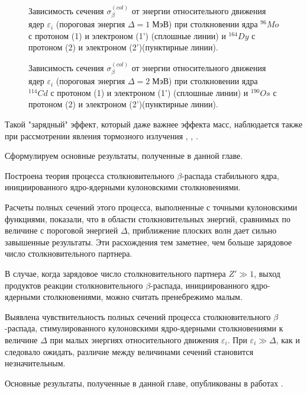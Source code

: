 \begin{figure}
\vspace{18 true cm}
\caption{{ Зависимость сечения  $\sigma^{(col)}_\beta$ от энергии относительного
движения ядер $\varepsilon_i$ (пороговая энергия $\Delta=1\; МэВ$)  при столкновении
ядра ${}^{96}Mo$ с  протоном (1) и электроном (1') (сплошные линии) и $^{164}Dy$ с  протоном (2) и электроном (2')(пунктирные линии).
}}
\label{MODY}
\end{figure}

\begin{figure}
\vspace{18 true cm}
\caption{{ Зависимость сечения  $\sigma^{(col)}_\beta$ от энергии относительного
движения ядер $\varepsilon_i$ (пороговая энергия $\Delta=2\; МэВ$)  при столкновении
ядра ${}^{114}Cd$ с  протоном (1) и электроном (1') (сплошные линии) и $^{190}Os$ с  протоном (2) и электроном (2')(пунктирные линии).
}}
\label{CDOS}
\end{figure}


Такой "зарядный" эффект, который даже важнее эффекта масс, наблюдается также при рассмотрении явления тормозного
излучения \cite{zomm},
\cite{ahi}, \cite{BLP}.

Сформулируем основные результаты, полученные в данной главе.


Построена теория
процесса столкновительного $\beta$-распада стабильного ядра, инициированного
ядро-ядерными кулоновскими столкновениями.

Расчеты полных сечений этого процесса, выполненные с точными кулоновскими
функциями, показали, что
в области столкновительных энергий, сравнимых по величине с пороговой
энергией $\Delta$,
приближение плоских волн дает сильно завышенные результаты. Эти расхождения
тем заметнее, чем больше зарядовое число столкновительного партнера.

В случае, когда зарядовое число столкновительного партнера $Z'\gg 1$, выход
продуктов реакции столкновительного $\beta$-распада, инициированного
ядро-ядерными столкновениями, можно считать пренебрежимо малым.

Выявлена чувствительность полных сечений процесса столкновительного
$\beta$-распада, стимулированного кулоновскими ядро-ядерными столкновениями
к величине $\Delta$
при малых энергиях относительного движения $\varepsilon_i$.
При $\varepsilon_i \gg \Delta$, как и следовало ожидать, различие между
величинами сечений становится незначительным.

Основные результаты, полученные в данной главе, опубликованы в работах
\cite{K5, K6, K7}.
